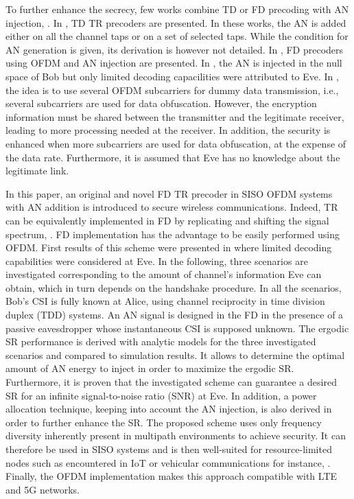 \documentclass[12pt, draftclsnofoot, onecolumn]{IEEEtran}
\begin{document}
To further enhance the secrecy, few works combine TD or FD precoding with AN injection, \cite{9049811,xu2018security,li2018artificial,li2017artificial,7475864,7041552}. In \cite{xu2018security,li2018artificial,li2017artificial}, TD TR precoders are presented. In these works, the AN is added either on all the channel taps or on a set of selected taps. While the condition for AN generation is given, its derivation is however not detailed. In \cite{9049811,7475864,7041552}, FD precoders using OFDM and AN injection are presented. In \cite{9049811}, the AN is injected in the null space of Bob but only limited decoding capacilities were attributed to Eve. In \cite{7475864,7041552}, the idea is to use several OFDM subcarriers for dummy data transmission, i.e., several subcarriers are used for data obfuscation. However, the encryption information must be shared between the transmitter and the legitimate receiver, leading to more processing needed at the receiver. In addition, the security is enhanced when more subcarriers are used for data obfuscation, at the expense of the data rate. Furthermore, it is assumed that Eve has no knowledge about the legitimate link.

In this paper, an original and novel FD TR precoder in SISO OFDM systems with AN addition is introduced to secure wireless communications. Indeed, TR can be equivalently implemented in FD by replicating and shifting the signal spectrum, \cite{8883213}. FD implementation has the advantage to be easily performed using OFDM. First results of this scheme were presented in \cite{9049811} where limited decoding capabilities were considered at Eve. In the following, three scenarios are investigated corresponding to the amount of channel's information Eve can obtain, which in turn depends on the handshake procedure.  In all the scenarios, Bob's CSI is fully known at Alice, using channel reciprocity in time division duplex (TDD) systems. An AN signal is designed in the FD in the presence of a passive eavesdropper whose instantaneous CSI is supposed unknown. The ergodic SR performance is derived with analytic models for the three investigated scenarios and compared to simulation results. It allows to determine the optimal amount of AN energy to inject in order to maximize the ergodic SR. Furthermore, it is proven that the investigated scheme can guarantee a desired SR for an infinite signal-to-noise ratio (SNR) at Eve. In addition, a power allocation technique, keeping into account the AN injection, is also derived in order to further enhance the SR. The proposed scheme uses only frequency diversity inherently present in multipath environments to achieve security. It can therefore be used in SISO systems and is then well-suited for resource-limited nodes such as encountered in IoT or vehicular communications for instance, \cite{9049811}. Finally, the OFDM implementation makes this approach compatible with LTE and 5G networks.
\end{document}
